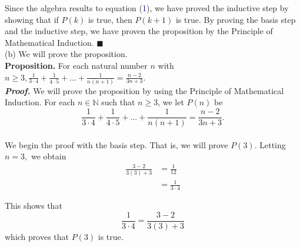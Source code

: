 \documentclass{article}
\begin{document}
Since the algebra results to equation (\textcolor{blue}{1}), we have proved the inductive step by showing that if $P(k)$ is true, then $P(k + 1)$ is true. By proving the basis step and the inductive step, we have proven the proposition by the Principle of Mathematical Induction. \hfill$\blacksquare$ \\

(b) We will prove the proposition.\\
\textbf{Proposition.} For each natural number $n$ with $n \geq 3, \frac{1}{3 \cdot 4} + \frac{1}{4 \cdot 5} + ... + \frac{1}{n(n + 1)} = \frac{n - 2}{3n + 3}$.\\
\textit{\textbf{Proof.}} We will prove the proposition by using the Principle of Mathematical Induction. For each $n \in \mathbb{N}$ such that $n \geq 3$, we let $P(n)$ be
\begin{equation*}
\frac{1}{3 \cdot 4} + \frac{1}{4 \cdot 5} + ... + \frac{1}{n(n + 1)} = \frac{n - 2}{3n + 3}.
\end{equation*} \\

We begin the proof with the basis step. That is, we will prove $P(3)$. Letting $n = 3,$ we obtain
\begin{align*}
\frac{3 - 2}{3(3) + 3} &= \frac{1}{12}\\
&= \frac{1}{3 \cdot 4}
\end{align*}

This shows that 
\begin{equation*}
\frac{1}{3 \cdot 4} = \frac{3 - 2}{3(3) + 3}
\end{equation*}
which proves that $P(3)$ is true.\\
\end{document}
